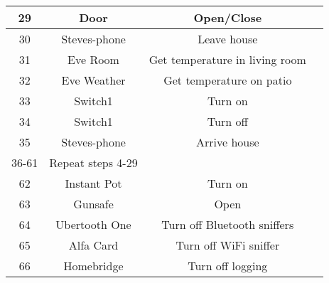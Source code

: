 \begin{table}[h!]
\begin{tabular}{|c|c|c|c|}
		\hline
		29 & Door & Open/Close &  \\
		\hline
		30 & Steves-phone & Leave house &  \\
		\hline
		31 & Eve Room & Get temperature in living room &  \\
		\hline
		32 & Eve Weather & Get temperature on patio &  \\
		\hline
		33 & Switch1 & Turn on &  \\
		\hline
		34 & Switch1 & Turn off &  \\
		\hline
		35 & Steves-phone & Arrive house &  \\
		\hline
		36-61 & Repeat steps 4-29 &  &  \\
		\hline
		62 & Instant Pot & Turn on &  \\
		\hline
		63 & Gunsafe  & Open &  \\
		\hline
		64 & Ubertooth One & Turn off Bluetooth sniffers &  \\
		\hline
		65 & Alfa Card & Turn off WiFi sniffer &  \\
		\hline
		66 & Homebridge & Turn off logging &  \\
		\hline
	\end{tabular}
\label{addlabel}
\end{table}